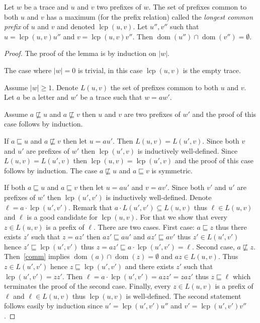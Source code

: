 \documentclass[a4paper,UKenglish]{lipics-v2016}
\newcommand{\pref}{\sqsubseteq}
\DeclareMathOperator{\dom}{dom}
\DeclareMathOperator{\lcp}{lcp}
\begin{document}
\begin{lemma}\label{lem:lcp}
Let $w$ be a trace and $u$ and $v$ two prefixes of $w$.
The set of prefixes common to both $u$ and $v$ has a maximum
(for the prefix relation) called the \emph{longest common prefix} of $u$
and $v$ and denoted $\lcp(u,v)$.
Let $u'',v''$ such that $u=\lcp(u,v)u''$
and $v=\lcp(u,v)v''$.
Then $\dom(u'')\cap \dom(v'')=\emptyset$.
\end{lemma}
\begin{proof}
The proof of the lemma is by induction on $|w|$.

The case where $|w |=0$ is trivial,
in this case $\lcp(u,v)$ is the empty trace.

Assume $|w|\geq 1$.
Denote $L(u,v)$ the set of prefixes common to both $u$ and $v$.
Let $a$ be a letter and $w'$ be a trace such that $w=aw'$.

Assume $a\not \pref u$ and $a\not\pref v$ then $u$ and $v$ are two prefixes of $w'$
and the proof of this case follows by induction.

If $a \pref u$ and $a \not\pref v$ then let $u=au'$.
Then $L(u,v)=L(u',v)$. Since both $v$ and $u'$ are prefixes of
$w'$ then $\lcp(u',v)$ is inductively well-defined.
Since $L(u,v)=L(u',v)$ then $\lcp(u,v)=\lcp(u',v)$ and the proof 
of this case follows by induction.
The case $a \not \pref u$ and $a \pref v$ is symmetric.

If both $a \pref u$ and $a \pref v$ then let $u=au'$ and $v=av'$.
Since both $v'$ and $u'$ are prefixes of
$w'$ then $\lcp(u',v')$ is inductively well-defined. 
Denote $\ell = a \cdot \lcp(u',v')$.
Remark that $a\cdot L(u',v') \subseteq L(u,v)$ thus $\ell \in L(u,v)$
and $\ell$ is a good candidate for $\lcp(u,v)$. 
For that we show that every $z \in L(u,v)$ is a prefix of $\ell$.
There are two cases.
First case: $a\pref z$ thus there exists $z'$ such that $z=az'$ then $az'\pref au'$ and $az'\pref av'$
thus $z'\in L(u',v')$ hence $z'\pref \lcp(u',v')$ thus $z =az' \pref a \cdot \lcp(u',v') = \ell$.
Second case, $a\not \pref z$. Then~\eqref{comm} implies
$\dom(a) \cap \dom(z) = \emptyset$
and
$az \in L(u,v)$.
Thus $z \in L(u',v')$ hence
$z \pref \lcp(u',v')$ and there exists $z' $ such that $\lcp(u',v') = z z'$.
Then $\ell = a \cdot \lcp(u',v') = a z z' = z a z'$
thus  $z\pref \ell$ which terminates the proof of the second case.
Finally, every $z \in L(u,v)$ is a prefix of $\ell$ and $\ell \in L(u,v)$
thus $\lcp(u,v)$ is well-defined.
The second statement follows easily by induction
since $u' = \lcp(u',v') u''$ and $v'= \lcp(u',v') v''$.
\end{proof}
\end{document}
